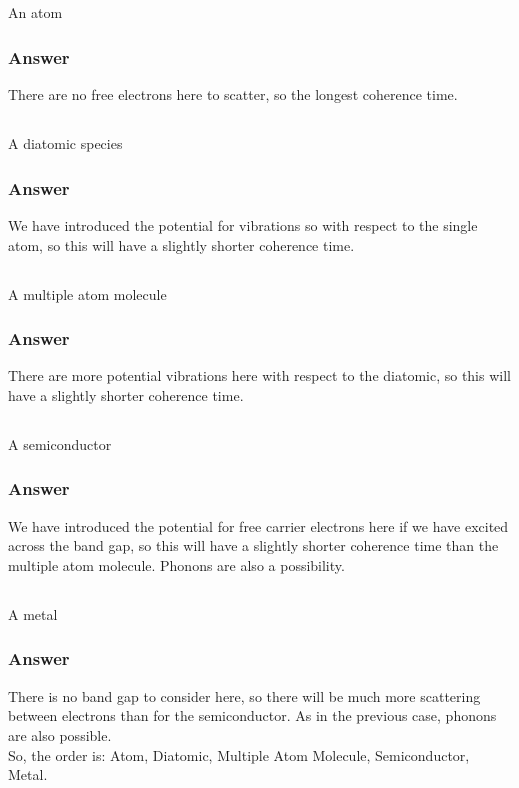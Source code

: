 \documentclass[12pt]{article}
\begin{document}
\subsection{}
An atom
\subsubsection{Answer}
There are no free electrons here to scatter, so the longest coherence time.
\subsection{}
A diatomic species
\subsubsection{Answer}
We have introduced the potential for vibrations so with respect to the single atom, so this will have a slightly shorter coherence time.
\subsection{}
A multiple atom molecule
\subsubsection{Answer}
There are more potential vibrations here with respect to the diatomic, so this will have a slightly shorter coherence time.
\subsection{}
A semiconductor
\subsubsection{Answer}
We have introduced the potential for free carrier electrons here if we have excited across the band gap, so this will have a slightly shorter coherence time than the multiple atom molecule. Phonons are also a possibility.
\subsection{}
A metal
\subsubsection{Answer}
There is no band gap to consider here, so there will be much more scattering between electrons than for the semiconductor. As in the previous case, phonons are also possible.\\
So, the order is: Atom, Diatomic, Multiple Atom Molecule, Semiconductor, Metal.
\end{document}
